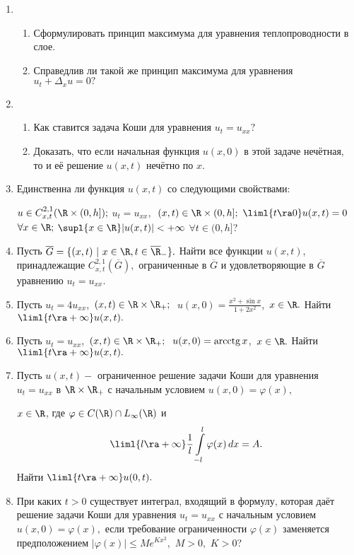 \documentclass[a4paper]{article}
\def\D{\Delta}
\def\fy{\varphi}
\def\i#1#2{\int\limits_{#1}^{#2}}
\begin{document}
\begin{enumerate}
\item
\begin{enumerate}
  \item
  Сформулировать принцип максимума для уравнения теплопроводности в слое.
  \item
  Справедлив ли такой же принцип максимума для уравнения $u_t+\D_xu=0?$
\end{enumerate}

\item
\begin{enumerate}
  \item
  Как ставится задача Коши для уравнения $u_t=u_{xx}?$
  \item
  Доказать, что если начальная функция $u(x,0)$ в этой задаче нечётная,
  то и её решение $u(x,t)$ нечётно по $x$.
\end{enumerate}

\item
Единственна ли функция $u(x,t)$ со следующими свойствами:

\noindent
$u\in C^{2,1}_{x,t}(\R\times(0,h]);$ $u_t=u_{xx},\ $
$(x,t)\in\R\times(0,h];$ $\liml{t\ra 0}u(x,t) = 0$ $\forall x\in
\R;$ $\supl{x\in\R}|u(x, t)|<+\infty$
$\forall t\in (0,h]$?

\item
Пусть $\overline G=\{(x,t)\ |\ x\in\R, t\in \overline
{\R}_-\}.$ Найти все функции $u(x,t)$, принадлежащие
$C^{2,1}_{x,t}(\overline G),$ ограниченные в $\overline G$ и удовлетворяющие
в $\overline G$ уравнению $u_t=u_{xx}.$

\item
Пусть $u_{t}=4u_{xx}$,\ $(x,t)\in \R\times\R_+;\ $
$u(x,0)=\displaystyle{\frac{x^2+\sin x}{1+2x^2}}$,\ $x\in\R.$
Найти $\liml{t\ra+\infty} u(x,t).$

\item
Пусть $u_{t}=u_{xx}$,\ $(x,t)\in \R\times\R_+;\ $
$u(x,0)=\hbox{arcctg}\,x$,\ $x\in\R.$
Найти $\liml{t\ra+\infty} u(x,t).$

\item
Пусть $u(x,t) -$ ограниченное решение задачи Коши для уравнения
$u_{t}=u_{xx}$ в $\R\times\R_+$ с начальным условием
$u(x,0)=\fy(x),$

\noindent
$x\in\R$, где $\fy\in C(\R)\cap L_\infty(\R)$
и
$$\liml{l\ra+\infty}\displaystyle{\frac{1}{l}\i{-l}{l}\fy(x)}\,
dx =A.$$
Найти $\liml{t\ra+\infty}u(0,t).$

\item
При каких $t>0$ существует интеграл, входящий в формулу, которая да\"ет
решение задачи Коши для уравнения $u_t=u_{xx}$  с начальным условием
$u(x,0)=\fy(x),$ если требование ограниченности $\fy(x)$ заменяется
предположением $|\fy(x)|\le M e^{Kx^2},$ $M>0,$ $K>0$?


\end{enumerate}
\end{document}
